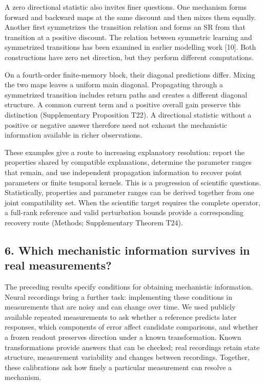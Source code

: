 \documentclass[11pt,a4paper]{article}
\begin{document}
A zero directional statistic also invites finer questions. One mechanism
forms forward and backward maps at the same discount and then mixes them
equally. Another first symmetrizes the transition relation and forms an
SR from that transition at a positive discount. The relation between
symmetric learning and symmetrized transitions has been examined in
earlier modelling work {[}10{]}. Both constructions have zero net
direction, but they perform different computations.

On a fourth-order finite-memory block, their diagonal predictions
differ. Mixing the two maps leaves a uniform main diagonal. Propagating
through a symmetrized transition includes return paths and creates a
different diagonal structure. A common current term and a positive
overall gain preserve this distinction (Supplementary Proposition T22).
A directional statistic without a positive or negative answer therefore
need not exhaust the mechanistic information available in richer
observations.

These examples give a route to increasing explanatory resolution: report
the properties shared by compatible explanations, determine the
parameter ranges that remain, and use independent propagation
information to recover point parameters or finite temporal kernels. This
is a progression of scientific questions. Statistically, properties and
parameter ranges can be derived together from one joint compatibility
set. When the scientific target requires the complete operator, a
full-rank reference and valid perturbation bounds provide a
corresponding recovery route (Methods; Supplementary Theorem T24).

\subsection{6. Which mechanistic information survives in real
measurements?}\label{which-mechanistic-information-survives-in-real-measurements}

The preceding results specify conditions for obtaining mechanistic
information. Neural recordings bring a further task: implementing these
conditions in measurements that are noisy and can change over time. We
used publicly available repeated measurements to ask whether a reference
predicts later responses, which components of error affect candidate
comparisons, and whether a frozen readout preserves direction under a
known transformation. Known transformations provide answers that can be
checked; real recordings retain state structure, measurement variability
and changes between recordings. Together, these calibrations ask how
finely a particular measurement can resolve a mechanism.
\end{document}
